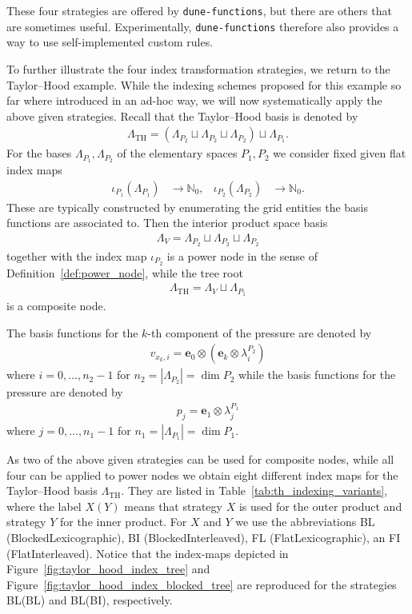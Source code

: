 \documentclass[a4paper,10pt,headings=normal,bibliography=totoc]{scrartcl}
\newcommand{\dunemodule}[1]{\texttt{#1}}
\begin{document}
These four strategies are offered by \dunemodule{dune-functions}, but there are others
that are sometimes useful.  Experimentally, \dunemodule{dune-functions} therefore also
provides a way to use self-implemented custom rules.

\bigskip

To further illustrate the four index transformation strategies, we return to
the Taylor--Hood example.
While the indexing schemes proposed for this example so far where
introduced in an ad-hoc way, we will now systematically apply
the above given strategies.  Recall that the Taylor--Hood basis is denoted by
\begin{align*}
 \Lambda_\text{TH}
  = (\Lambda_{P_2} \sqcup \Lambda_{P_2} \sqcup \Lambda_{P_2}) \sqcup \Lambda_{P_1}.
\end{align*}
For the bases $\Lambda_{P_1}, \Lambda_{P_2}$
of the elementary spaces $P_1,P_2$ we consider fixed given flat index maps
\begin{align*}
  \iota_{P_1}(\Lambda_{P_1}) &\to \mathbb{N}_0, &
  \iota_{P_2}(\Lambda_{P_2}) &\to \mathbb{N}_0.
\end{align*}
These are typically constructed by enumerating the grid entities
the basis functions are associated to.
Then the interior product space basis
\begin{align*}
  \Lambda_V = \Lambda_{P_2} \sqcup \Lambda_{P_2} \sqcup \Lambda_{P_2}
\end{align*}
together with the index map $\iota_{P_2}$ is a power node in the
sense of Definition~\ref{def:power_node}, while the tree root
\begin{align*}
 \Lambda_\text{TH}
  = \Lambda_V \sqcup \Lambda_{P_1}
\end{align*}
is a composite node.

The basis functions for the $k$-th component of the pressure
are denoted by
\begin{align*}
  v_{x_k,i} = \mathbf{e}_0 \otimes (\mathbf{e}_k \otimes \lambda^{P_2}_i)
\end{align*}
where $i=0,\dots,n_2-1$ for $n_2=|\Lambda_{P_2}|= \operatorname{dim} P_2$
while the basis functions for the pressure are denoted by
\begin{align*}
  p_{j} = \mathbf{e}_1 \otimes \lambda^{P_1}_j
\end{align*}
where $j=0,\dots,n_1-1$ for $n_1=|\Lambda_{P_1}|= \operatorname{dim} P_1$.

As two of the above given strategies can be used
for composite nodes, while all four can be applied to power nodes
we obtain eight different index maps for the Taylor--Hood basis
$\Lambda_{\text{TH}}$.
They are listed in Table~\ref{tab:th_indexing_variants}, where the label $X(Y)$
means that strategy $X$ is used for the outer product and strategy $Y$
for the inner product. For $X$ and $Y$ we use the abbreviations BL
(BlockedLexicographic), BI (BlockedInterleaved), FL (FlatLexicographic), an FI (FlatInterleaved).
Notice that the index-maps depicted in
Figure~\ref{fig:taylor_hood_index_tree} and Figure~\ref{fig:taylor_hood_index_blocked_tree}
are reproduced for the strategies
BL(BL) and BL(BI), respectively.
\end{document}
